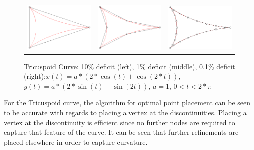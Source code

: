 \begin{figure}[h!]
  \centering
  \begin{tabular}{ccc}
  \includegraphics[width=0.3\linewidth]{Figures/tricuspoid01.png} &
  \includegraphics[width=0.3\linewidth]{Figures/tricuspoid001.png} &
  \includegraphics[width=0.3\linewidth]{Figures/tricuspoid0001.png}
  \end{tabular}
  \caption{\label{fig:tricuspoid} Tricuspoid Curve: 10\% deficit (left), 
1\% deficit (middle), 0.1\% deficit (right);\newline $x(t) = a*(2*\cos(t) 
+ \cos(2*t))$, $y(t) = a*(2*\sin(t) - \sin(2t))$, $a=1$, $0<t<2*\pi$}
\end{figure}

For the Tricuspoid curve, the algorithm for optimal point placement can be seen to be accurate with regards to placing a vertex at the discontinuities. Placing a vertex at the discontinuity is efficient since no further nodes are required to capture that feature of the curve. It can be seen that further refinements are placed elsewhere in order to capture curvature.

